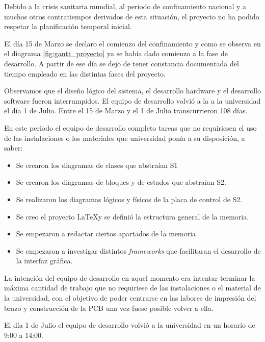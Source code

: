 Debido a la crisis sanitaria mundial, al periodo de confinamiento nacional y a muchos otros contratiempos derivados de esta situación, el proyecto no ha podido respetar la planificación temporal inicial.

El día 15 de Marzo se declaro el comienzo del confinamiento y como se observa en el diagrama \ref{fig:gantt_proyecto} ya se había dado comienzo a la fase de desarrollo. A partir de ese día se dejo de tener constancia documentada del tiempo empleado en las distintas fases del proyecto.

Observamos que el diseño lógico del sistema, el desarrollo hardware y el desarrollo software fueron interrumpidos. El equipo de desarrollo volvió a la a la universidad el día 1 de Julio. Entre el 15 de Marzo y el 1 de Julio transcurrieron 108 días.

En este periodo el equipo de desarrollo completo tareas que no requiriesen el uso de las instalaciones o los materiales que universidad ponía a su disposición, a saber:

\begin{itemize}
    \item Se crearon los diagramas de clases que abstraían \ac{S1}
    \item Se crearon los diagramas de bloques y de estados que abstraían \ac{S2}.
    \item Se realizaron los diagramas lógicos y físicos de la placa de control de \ac{S2}.
    \item Se creo el proyecto \LaTeX y se definió la estructura general de la memoria.
    \item Se empezaron a redactar ciertos apartados de la memoria 
    \item Se empezaron a investigar distintos \textit{frameworks} que facilitaran el desarrollo de la interfaz gráfica.
\end{itemize}

La intención del equipo de desarrollo en aquel momento era intentar terminar la máxima cantidad de trabajo que no requiriese de las instalaciones o el material de la universidad, con el objetivo de poder centrarse en las labores de impresión del brazo y construcción de la PCB una vez fuese posible volver a ella.

El día 1 de Julio el equipo de desarrollo volvió a la universidad en un horario de 9:00 a 14:00.

